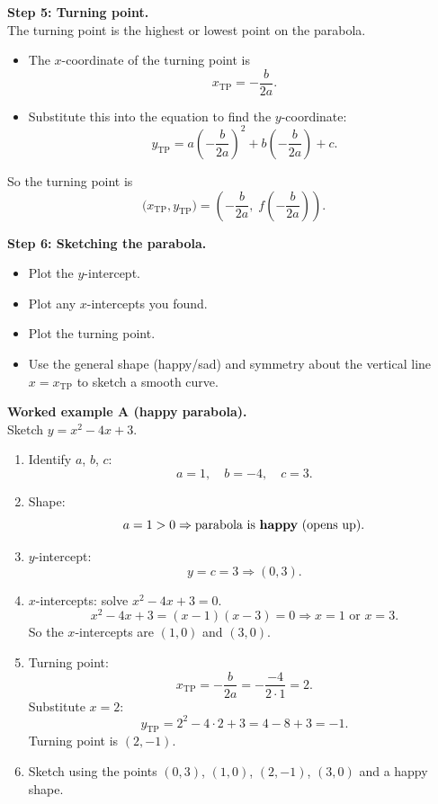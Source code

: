 \documentclass[12pt,a4paper]{article}
\begin{document}
\textbf{Step 5: Turning point.}\\[0.3ex]
The turning point is the highest or lowest point on the parabola.
\begin{itemize}
  \item The $x$-coordinate of the turning point is
  \[
  x_{\text{TP}} = -\frac{b}{2a}.
  \]
  \item Substitute this into the equation to find the $y$-coordinate:
  \[
  y_{\text{TP}} = a\left(-\frac{b}{2a}\right)^2
                  + b\left(-\frac{b}{2a}\right)
                  + c.
  \]
\end{itemize}
So the turning point is
\[
\big(x_{\text{TP}}, y_{\text{TP}}\big)
=
\left(-\frac{b}{2a},\; f\!\left(-\frac{b}{2a}\right)\right).
\]

\textbf{Step 6: Sketching the parabola.}\\[0.3ex]
\begin{itemize}
  \item Plot the $y$-intercept.
  \item Plot any $x$-intercepts you found.
  \item Plot the turning point.
  \item Use the general shape (happy/sad) and symmetry about the vertical line $x = x_{\text{TP}}$ to sketch a smooth curve.
\end{itemize}

\vspace{0.6cm}
\textbf{Worked example A (happy parabola).}\\[0.4ex]
Sketch $y = x^2 - 4x + 3$.

\begin{enumerate}
  \item Identify $a$, $b$, $c$:
  \[
  a = 1,\quad b = -4,\quad c = 3.
  \]
  \item Shape:
  \[
  a = 1 > 0 \Rightarrow \text{parabola is \textbf{happy} (opens up).}
  \]
  \item $y$-intercept:
  \[
  y = c = 3 \Rightarrow (0,3).
  \]
  \item $x$-intercepts: solve $x^2 - 4x + 3 = 0$.
  \[
  x^2 - 4x + 3 = (x-1)(x-3) = 0
  \Rightarrow x = 1 \text{ or } x = 3.
  \]
  So the $x$-intercepts are $(1,0)$ and $(3,0)$.
  \item Turning point:
  \[
  x_{\text{TP}} = -\frac{b}{2a} = -\frac{-4}{2 \cdot 1} = 2.
  \]
  Substitute $x = 2$:
  \[
  y_{\text{TP}} = 2^2 - 4\cdot 2 + 3 = 4 - 8 + 3 = -1.
  \]
  Turning point is $(2,-1)$.
  \item Sketch using the points $(0,3)$, $(1,0)$, $(2,-1)$, $(3,0)$ and a happy shape.
\end{enumerate}
\end{document}
